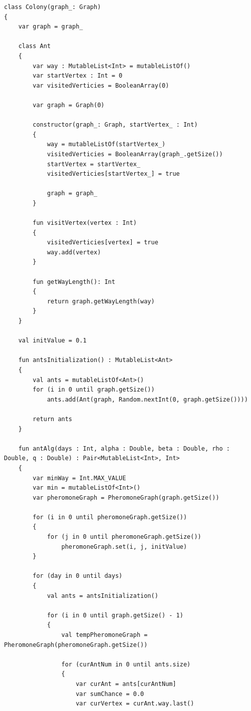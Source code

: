 \documentclass[12pt]{report}
\begin{document}
\begin{lstlisting}[caption=Класс реализации муравьиного алгоритма для решения задачи коммивояжера,
label={list:Colony}]
class Colony(graph_: Graph)
{
    var graph = graph_

    class Ant
    {
        var way : MutableList<Int> = mutableListOf()
        var startVertex : Int = 0
        var visitedVerticies = BooleanArray(0)

        var graph = Graph(0)

        constructor(graph_: Graph, startVertex_ : Int)
        {
            way = mutableListOf(startVertex_)
            visitedVerticies = BooleanArray(graph_.getSize())
            startVertex = startVertex_
            visitedVerticies[startVertex_] = true

            graph = graph_
        }

        fun visitVertex(vertex : Int)
        {
            visitedVerticies[vertex] = true
            way.add(vertex)
        }

        fun getWayLength(): Int
        {
            return graph.getWayLength(way)
        }
    }

    val initValue = 0.1

    fun antsInitialization() : MutableList<Ant>
    {
        val ants = mutableListOf<Ant>()
        for (i in 0 until graph.getSize())
            ants.add(Ant(graph, Random.nextInt(0, graph.getSize())))

        return ants
    }

    fun antAlg(days : Int, alpha : Double, beta : Double, rho : Double, q : Double) : Pair<MutableList<Int>, Int>
    {
        var minWay = Int.MAX_VALUE
        var min = mutableListOf<Int>()
        var pheromoneGraph = PheromoneGraph(graph.getSize())

        for (i in 0 until pheromoneGraph.getSize())
        {
            for (j in 0 until pheromoneGraph.getSize())
                pheromoneGraph.set(i, j, initValue)
        }

        for (day in 0 until days)
        {
            val ants = antsInitialization()

            for (i in 0 until graph.getSize() - 1)
            {
                val tempPheromoneGraph = PheromoneGraph(pheromoneGraph.getSize())

                for (curAntNum in 0 until ants.size)
                {
                    var curAnt = ants[curAntNum]
                    var sumChance = 0.0
                    var curVertex = curAnt.way.last()


\end{lstlisting}
\end{document}

